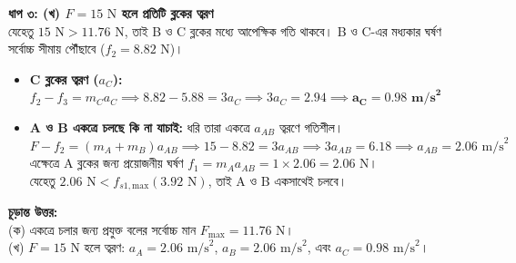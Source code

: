 \documentclass[12pt, a4paper]{article}
\begin{document}
\begin{tcolorbox}[solutionbox={সমাধান (Solution) }]
\vspace{0.5em}
\noindent
\textbf{ধাপ ৩: (খ) $F = 15\text{ N}$ হলে প্রতিটি ব্লকের ত্বরণ} \\
যেহেতু $15\text{ N} > 11.76\text{ N}$, তাই B ও C ব্লকের মধ্যে আপেক্ষিক গতি থাকবে। B ও C-এর মধ্যকার ঘর্ষণ সর্বোচ্চ সীমায় পৌঁছাবে ($f_2 = 8.82\text{ N}$)।
\begin{itemize}[leftmargin=*, parsep=0.5ex]
    \item \textbf{C ব্লকের ত্বরণ ($a_C$):} $f_2 - f_3 = m_C a_C \implies 8.82 - 5.88 = 3a_C \implies 3a_C = 2.94 \implies \mathbf{a_C = 0.98\text{ m/s}^2}$
    \item \textbf{A ও B একত্রে চলছে কি না যাচাই:} ধরি তারা একত্রে $a_{AB}$ ত্বরণে গতিশীল। \\
    $F - f_2 = (m_A + m_B)a_{AB} \implies 15 - 8.82 = 3a_{AB} \implies 3a_{AB} = 6.18 \implies a_{AB} = 2.06\text{ m/s}^2$ \\
    এক্ষেত্রে A ব্লকের জন্য প্রয়োজনীয় ঘর্ষণ $f_1 = m_A a_{AB} = 1 \times 2.06 = 2.06\text{ N}$। \\
    যেহেতু $2.06\text{ N} < f_{s1,\text{max}} (3.92\text{ N})$, তাই A ও B একসাথেই চলবে। 
\end{itemize}

\vspace{1em}
\begin{tcolorbox}[answerbox]
\textbf{চূড়ান্ত উত্তর:} \\
(ক) একত্রে চলার জন্য প্রযুক্ত বলের সর্বোচ্চ মান $F_{\text{max}} = 11.76\text{ N}$। \\
(খ) $F = 15\text{ N}$ হলে ত্বরণ: $a_A = 2.06\text{ m/s}^2$, $a_B = 2.06\text{ m/s}^2$, এবং $a_C = 0.98\text{ m/s}^2$।
\end{tcolorbox}
\end{tcolorbox}

\vspace{2em}
\end{document}
